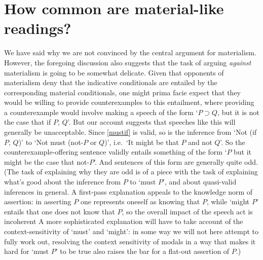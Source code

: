 \documentclass[If.tex]{subfiles}
\begin{document}
\section{How common are material-like readings?}
\label{sect:antimaterial}
We have said why we are not convinced by the central argument for materialism.  However, the foregoing discussion also suggests that the task of arguing \emph{against} materialism is going to be somewhat delicate.  Given that opponents of materialism deny that the indicative conditionals are entailed by the corresponding material conditionals, one might prima facie expect that they would be willing to provide counterexamples to this entailment, where providing a counterexample would involve making a speech of the form ‘$P ⊃ Q$, but it is not the case that if $P$, $Q$’.  But our account suggests that speeches like this will generally be unacceptable.  Since \ref{mustif} is valid, so is the inference from ‘Not (if $P$, $Q$)’ to ‘Not must (not-$P$ or $Q$)’, i.e.\ ‘It might be that $P$ and not $Q$’.  So the counterexample-offering sentence validly entails something of the form ‘$P$ but it might be the case that not-$P$’.  And sentences of this form are generally quite odd.  (The task of explaining why they are odd is of a piece with the task of explaining what's good about the inference from $P$ to ‘must $P$’, and about quasi-valid inferences in general.  A first-pass explanation appeals to the knowledge norm of assertion: in asserting $P$ one represents oneself as knowing that $P$, while ‘might $P$’ entails that one does not know that $P$, so the overall impact of the speech act is incoherent  A more sophisticated explanation will have to take account of the context-sensitivity of ‘must’ and ‘might’: in some way we will not here attempt to fully work out, resolving the context sensitivity of modals in a way that makes it hard for ‘must $P$’ to be true also raises the bar for a flat-out assertion of $P$.)
\end{document}
